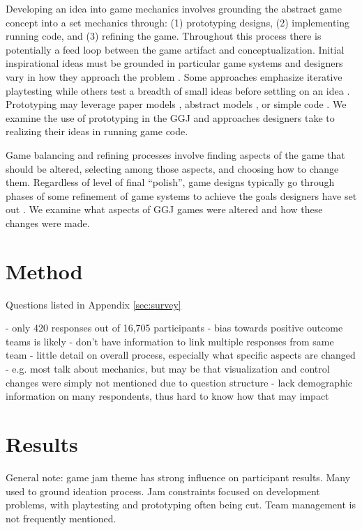 \documentclass{sig-alternate}
\begin{document}
Developing an idea into game mechanics involves grounding the abstract game concept into a set mechanics through: (1) prototyping designs, (2) implementing running code, and (3) refining the game. Throughout this process there is potentially a feed loop between the game artifact and conceptualization. Initial inspirational ideas must be grounded in particular game systems and designers vary in how they approach the problem \cite{gabler2005:7day-prototype} \cite{manker2011:prototyping} \cite{nelson2009:reqanal}. Some approaches emphasize iterative playtesting \cite{fullerton2008:playcentric} \cite{schell2008:gamedesign} while others test a breadth of small ideas before settling on an idea \cite{gabler2005:7day-prototype}. Prototyping may leverage paper models \cite{manker2011:prototyping}, abstract models \cite{nelson2009:reqanal} \cite{dormans2011:machinations2}, or simple code \cite{gabler2005:7day-prototype}. We examine the use of prototyping in the GGJ and approaches designers take to realizing their ideas in running game code.

Game balancing and refining processes involve finding aspects of the game that should be altered, selecting among those aspects, and choosing how to change them. Regardless of level of final ``polish'', game designs typically go through phases of some refinement of game systems to achieve the goals designers have set out \cite{schell2008:gamedesign} \cite{fullerton2008:playcentric}. We examine what aspects of GGJ games were altered and how these changes were made.

\section{Method}


Questions listed in Appendix \ref{sec:survey}

- only 420 responses out of 16,705 participants
- bias towards positive outcome teams is likely
- don't have information to link multiple responses from same team
- little detail on overall process, especially what specific aspects are changed
	- e.g. most talk about mechanics, but may be that visualization and control changes were simply not mentioned due to question structure
- lack demographic information on many respondents, thus hard to know how that may impact

\section{Results}
General note: game jam theme has strong influence on participant results. Many used to ground ideation process. Jam constraints focused on development problems, with playtesting and prototyping often being cut. Team management is not frequently mentioned.
\end{document}

